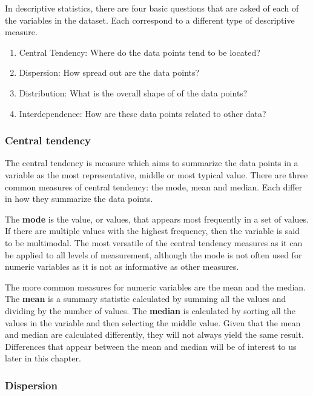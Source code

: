 \documentclass[
  letterpaper,
  DIV=11,
  numbers=noendperiod]{scrreport}
\providecommand{\tightlist}{%
  \setlength{\itemsep}{0pt}\setlength{\parskip}{0pt}}\usepackage{longtable,booktabs,array}
\theoremstyle{definition}
\theoremstyle{remark}
\begin{document}
In descriptive statistics, there are four basic questions that are asked
of each of the variables in the dataset. Each correspond to a different
type of descriptive measure.

\begin{enumerate}
\def\labelenumi{\arabic{enumi}.}
\tightlist
\item
  Central Tendency: Where do the data points tend to be located?
\item
  Dispersion: How spread out are the data points?
\item
  Distribution: What is the overall shape of of the data points?
\item
  Interdependence: How are these data points related to other data?
\end{enumerate}

\hypertarget{sec-aa-central-tendency}{%
\subsubsection{Central tendency}\label{sec-aa-central-tendency}}

The central tendency is measure which aims to summarize the data points
in a variable as the most representative, middle or most typical value.
There are three common measures of central tendency: the mode, mean and
median. Each differ in how they summarize the data points.

The \textbf{mode} is the value, or values, that appears most frequently
in a set of values. If there are multiple values with the highest
frequency, then the variable is said to be multimodal. The most
versatile of the central tendency measures as it can be applied to all
levels of measurement, although the mode is not often used for numeric
variables as it is not as informative as other measures.

The more common measures for numeric variables are the mean and the
median. The \textbf{mean} is a summary statistic calculated by summing
all the values and dividing by the number of values. The \textbf{median}
is calculated by sorting all the values in the variable and then
selecting the middle value. Given that the mean and median are
calculated differently, they will not always yield the same result.
Differences that appear between the mean and median will be of interest
to us later in this chapter.

\hypertarget{dispersion}{%
\subsubsection{Dispersion}\label{dispersion}}
\end{document}
